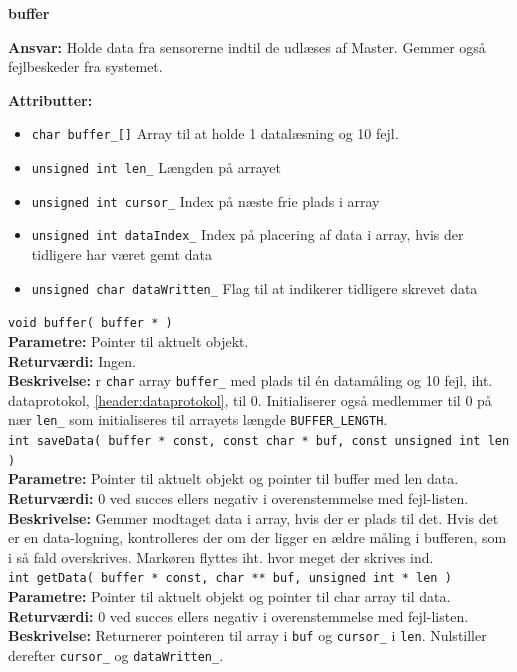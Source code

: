{\centering
\textbf{buffer}\par
}
\textbf{Ansvar:} Holde data fra sensorerne indtil de udlæses af Master. Gemmer også fejlbeskeder fra systemet. \

\textbf{Attributter:}
\begin{itemize}
	\item \verb+char buffer_[]+ Array til at holde 1 datalæsning og 10 fejl.
	\item \verb+unsigned int len_+ Længden på arrayet
	\item \verb+unsigned int cursor_+ Index på næste frie plads i array
	\item \verb+unsigned int dataIndex_+ Index på placering af data i array, hvis der tidligere har været gemt data
	\item \verb+unsigned char dataWritten_+ Flag til at indikerer tidligere skrevet data
\end{itemize}

\verb+void buffer( buffer * )+ \\
\textbf{Parametre:} Pointer til aktuelt objekt. \\
\textbf{Returværdi:} Ingen. \\
\textbf{Beskrivelse:} r \verb+char+ array \verb+buffer_+ med plads til én datamåling og 10 fejl, iht. dataprotokol, \ref{header:dataprotokol}, til 0. Initialiserer også medlemmer til 0 på nær \verb+len_+ som initialiseres til arrayets længde \verb+BUFFER_LENGTH+.\\

\verb+int saveData( buffer * const, const char * buf, const unsigned int len )+ \\
\textbf{Parametre:} Pointer til aktuelt objekt og pointer til buffer med len data. \\
\textbf{Returværdi:} 0 ved succes ellers negativ i overenstemmelse med fejl-listen. \\
\textbf{Beskrivelse:} Gemmer modtaget data i array, hvis der er plads til det. Hvis det er en data-logning, kontrolleres der om der ligger en ældre måling i bufferen, som i så fald overskrives. Markøren flyttes iht. hvor meget der skrives ind. \\

\verb+int getData( buffer * const, char ** buf, unsigned int * len )+ \\
\textbf{Parametre:} Pointer til aktuelt objekt og pointer til char array til data. \\
\textbf{Returværdi:} 0 ved succes ellers negativ i overenstemmelse med fejl-listen. \\
\textbf{Beskrivelse:} Returnerer pointeren til array i \verb+buf+ og \verb+cursor_+ i \verb+len+. Nulstiller derefter \verb+cursor_+ og \verb+dataWritten_+.\\